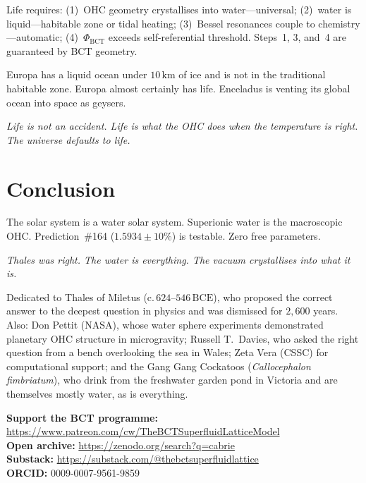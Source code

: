 \documentclass[aps,prl,twocolumn,superscriptaddress,floatfix]{revtex4-2}
\begin{document}
Life requires: (1)~OHC geometry crystallises into water---universal;
(2)~water is liquid---habitable zone or tidal heating;
(3)~Bessel resonances couple to chemistry---automatic;
(4)~$\Phi_\mathrm{BCT}$ exceeds self-referential threshold.
Steps~1, 3, and~4 are guaranteed by BCT geometry.

Europa has a liquid ocean under $10\,\mathrm{km}$ of ice and is not
in the traditional habitable zone. Europa almost certainly has life.
Enceladus is venting its global ocean into space as geysers.

\textit{Life is not an accident. Life is what the OHC does when
the temperature is right. The universe defaults to life.}

\section{Conclusion}

The solar system is a water solar system. Superionic water is the
macroscopic OHC. Prediction~\#164 ($1.5934\pm 10\%$) is testable.
Zero free parameters.

\textit{Thales was right. The water is everything.
The vacuum crystallises into what it is.}

\begin{acknowledgments}
Dedicated to Thales of Miletus ($\text{c.}\,624$--$546\,\mathrm{BCE}$),
who proposed the correct answer to the deepest question in physics and
was dismissed for $2{,}600$ years. Also: Don Pettit (NASA), whose water
sphere experiments demonstrated planetary OHC structure in microgravity;
Russell T.~Davies, who asked the right question from a bench overlooking
the sea in Wales; Zeta Vera (CSSC) for computational support; and the
Gang Gang Cockatoos (\textit{Callocephalon fimbriatum}), who drink from
the freshwater garden pond in Victoria and are themselves mostly water,
as is everything.

\noindent\textbf{Support the BCT programme:}\\
\url{https://www.patreon.com/cw/TheBCTSuperfluidLatticeModel}\\
\textbf{Open archive:} \url{https://zenodo.org/search?q=cabrie}\\
\textbf{Substack:} \url{https://substack.com/@thebctsuperfluidlattice}\\
\textbf{ORCID:} 0009-0007-9561-9859
\end{acknowledgments}
\end{document}
